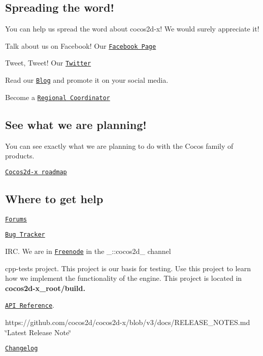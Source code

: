 \subsection*{Spreading the word! }

You can help us spread the word about cocos2d-\/x! We would surely appreciate it!


\begin{DoxyItemize}
\item Talk about us on Facebook! Our \href{https://www.facebook.com/cocos2dx/}{\tt Facebook Page}
\item Tweet, Tweet! Our \href{https://twitter.com/cocos2dx}{\tt Twitter}
\item Read our \href{http://blog.cocos2d-x.org/}{\tt Blog} and promote it on your social media.
\item Become a \href{http://discuss.cocos2d-x.org/t/we-need-regional-coordinators/24104}{\tt Regional Coordinator}
\end{DoxyItemize}

\subsection*{See what we are planning! }

You can see exactly what we are planning to do with the Cocos family of products.


\begin{DoxyItemize}
\item \href{https://trello.com/b/Np6obnuE/cocos2d-x-roadmap}{\tt Cocos2d-\/x roadmap}
\end{DoxyItemize}

\subsection*{Where to get help }


\begin{DoxyItemize}
\item \href{http://discuss.cocos2d-x.org}{\tt Forums}
\item \href{https://github.com/cocos2d/cocos2d-x/issues}{\tt Bug Tracker}
\item I\+RC. We are in \href{https://webchat.freenode.net/}{\tt Freenode} in the \+\_\+\+::cocos2d\+\_\+ channel
\item {\ttfamily cpp-\/tests} project. This project is our basis for testing. Use this project to learn how we implement the functionality of the engine. This project is located in {\bfseries cocos2d-\/x\+\_\+root/build.}
\item \href{http://cocos2d-x.org/docs/api-ref/index.html}{\tt A\+PI Reference}.
\item https\+://github.com/cocos2d/cocos2d-\/x/blob/v3/docs/\+R\+E\+L\+E\+A\+S\+E\+\_\+\+N\+O\+T\+E\+S.\+md \char`\"{}\+Latest Release Note\char`\"{}
\item \href{https://github.com/cocos2d/cocos2d-x/blob/v3/CHANGELOG}{\tt Changelog}
\end{DoxyItemize}

